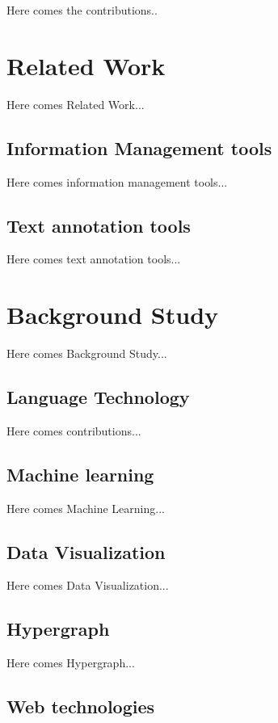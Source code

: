\documentclass[
    fontsize=12pt,
    headings=small,
    parskip=half,           %
    bibliography=totoc,
    numbers=noenddot,       %
    open=any,               %
    ]{scrreprt}
\begin{document}
Here comes the contributions..


\chapter{Related Work}

Here comes Related Work...


\section{Information Management tools}

Here comes information management tools...


\section{Text annotation tools}

Here comes text annotation tools...



\chapter{Background Study}

Here comes Background Study...


\section{Language Technology}

Here comes contributions...


\section{Machine learning}

Here comes Machine Learning...


\section{Data Visualization}

Here comes Data Visualization...

\section{Hypergraph}

Here comes Hypergraph...

\section{Web technologies}
\end{document}
